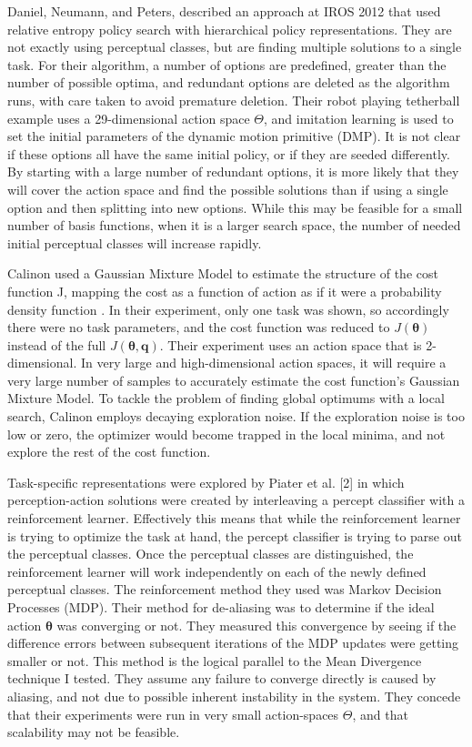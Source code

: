 \documentclass[12pt]{article}
\newcommand{\actsp}{\Theta}
\newcommand{\taskp}{\mathbf{q}}
\newcommand{\costf}{J}
\newcommand{\act}{\bm{\theta}}
\begin{document}
Daniel, Neumann, and Peters, described an approach at IROS 2012 \cite{daniel} that used relative entropy policy search with hierarchical policy representations. They are not exactly using perceptual classes, but are finding multiple solutions to a single task. For their algorithm, a number of options are predefined, greater than the number of possible optima, and redundant options are deleted as the algorithm runs, with care taken to avoid premature deletion. Their robot playing tetherball example uses a 29-dimensional action space $\actsp$, and imitation learning is used to set the initial parameters of the dynamic motion primitive (DMP). It is not clear if these options all have the same initial policy, or if they are seeded differently. By starting with a large number of redundant options, it is more likely that they will cover the action space and find the possible solutions than if using a single option and then splitting into new options. While this may be feasible for a small number of basis functions, when it is a larger search space, the number of needed initial perceptual classes will increase rapidly. 

Calinon used a Gaussian Mixture Model to estimate the structure of the cost function \costf, mapping the cost as a function of action as if it were a probability density function \cite{calinon}. In their experiment, only one task was shown, so accordingly there were no task parameters, and the cost function was reduced to $\costf(\act)$ instead of the full $\costf(\act,\taskp)$. Their experiment uses an action space that is 2-dimensional. In very large and high-dimensional action spaces, it will require a very large number of samples to accurately estimate the cost function's Gaussian Mixture Model. To tackle the problem of finding global optimums with a local search, Calinon employs decaying exploration noise. If the exploration noise is too low or zero, the optimizer would become trapped in the local minima, and not explore the rest of the cost function.

Task-specific representations were explored by Piater et al. [2] in which perception-action solutions were created by interleaving a percept classifier with a reinforcement learner. Effectively this means that while the reinforcement learner is trying to optimize the task at hand, the percept classifier is trying to parse out the perceptual classes. Once the perceptual classes are distinguished, the reinforcement learner will work independently on each of the newly defined perceptual classes. The reinforcement method they used was Markov Decision Processes (MDP). Their method for de-aliasing was to determine if the ideal action $\act$ was converging or not. They measured this convergence by seeing if the difference errors between subsequent iterations of the MDP updates were getting smaller or not. This method is the logical parallel to the Mean Divergence technique I tested. They assume any failure to converge directly is caused by aliasing, and not due to possible inherent instability in the system. They concede that their experiments were run in very small action-spaces $\actsp$, and that scalability may not be feasible. 
\end{document}
